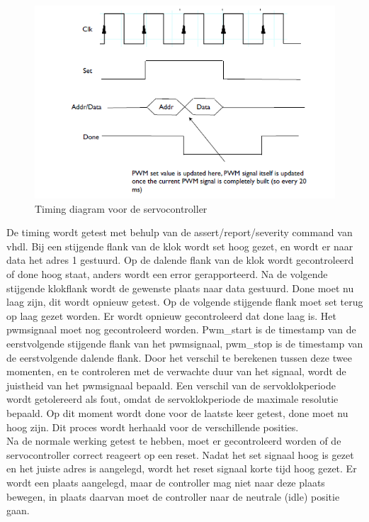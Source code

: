 \begin{figure}[H]
	\centering
	\includegraphics[width=\linewidth]{timing.png}
	\caption{Timing diagram voor de servocontroller}
\end{figure}
\noindent
De timing wordt getest met behulp van de assert/report/severity command van \gls{vhdl}. Bij een stijgende flank van de klok wordt set hoog gezet, en wordt er naar data het adres 1 gestuurd. Op de dalende flank van de klok wordt gecontroleerd of done hoog staat, anders wordt een error gerapporteerd. Na de volgende stijgende klokflank wordt de gewenste plaats naar data gestuurd. Done moet nu laag zijn, dit wordt opnieuw getest. Op de volgende stijgende flank moet set terug op laag gezet worden. Er wordt opnieuw gecontroleerd dat done laag is. Het \gls{pwm}signaal moet nog gecontroleerd worden. Pwm\_start is de timestamp van de eerstvolgende stijgende flank van het \gls{pwm}signaal, pwm\_stop is de timestamp van de eerstvolgende dalende flank. Door het verschil te berekenen tussen deze twee momenten, en te controleren met de verwachte duur van het signaal, wordt de juistheid van het \gls{pwm}signaal bepaald. Een verschil van de servoklokperiode wordt getolereerd als fout, omdat de servoklokperiode de maximale resolutie bepaald. Op dit moment wordt done voor de laatste keer getest, done moet nu hoog zijn. Dit proces wordt herhaald voor de verschillende posities.    \\

Na de normale werking getest te hebben, moet er gecontroleerd worden of de servocontroller correct reageert op een reset. Nadat het set signaal hoog is gezet en het juiste adres is aangelegd, wordt het reset signaal korte tijd hoog gezet. Er wordt een plaats aangelegd, maar de controller mag niet naar deze plaats bewegen, in plaats daarvan moet de controller naar de neutrale (idle) positie gaan.

